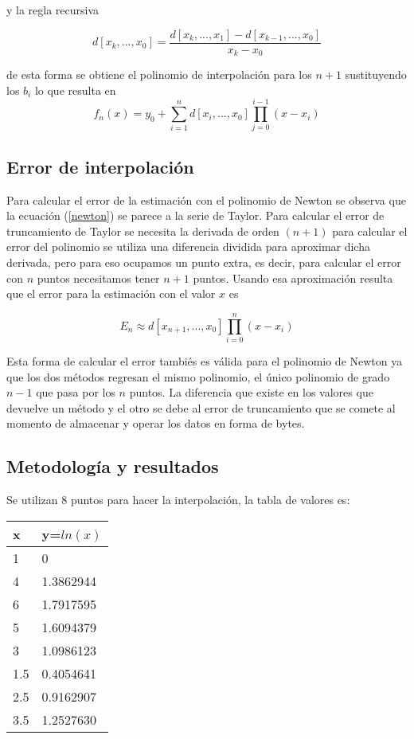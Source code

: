 \documentclass[10pt,twocolumn]{article}
\begin{document}
y la regla recursiva

\begin{equation}
	d[x_k,...,x_0]=\frac{d[x_k,...,x_1]-d[x_{k-1},...,x_0]}{x_k-x_0}
	\label{dif2}
\end{equation}

de esta forma se obtiene el polinomio de interpolaci\'on para los $n+1$ sustituyendo los $b_i$ lo que 
resulta en
\begin{equation} 	
	f_n(x)=y_0+\sum_{i=1}^{n}d[x_i,...,x_0]\prod_{j=0}^{i-1}(x-x_i)
	\label{newton}
\end{equation}

\subsection{Error de interpolaci\'on}
Para calcular el error de la estimaci\'on con el polinomio de Newton se observa que la ecuaci\'on 
(\ref{newton}) se parece a la serie de Taylor. Para calcular el error de truncamiento de Taylor se 
necesita la derivada de orden $(n+1)$ para calcular el error del polinomio se utiliza una diferencia 
dividida para aproximar dicha derivada, pero para eso ocupamos un punto extra, es decir, para calcular el 
error con $n$ puntos necesitamos tener $n+1$ puntos. Usando esa aproximaci\'on resulta que el error para 
la estimaci\'on con el valor $x$ es 

\begin{equation}
	E_n \approx d[x_{n+1},...,x_0]\prod_{i=0}^{n}(x-x_i)
	\label{mistake}
\end{equation}

Esta forma de calcular el error tambi\'es es v\'alida para el polinomio de Newton ya que los dos 
m\'etodos regresan el mismo polinomio, el \'unico polinomio de grado $n-1$ que pasa por los $n$ puntos. 
La diferencia que existe en los valores que devuelve un m\'etodo y el otro se debe al error de 
truncamiento que se comete al momento de almacenar y operar los datos en forma de bytes.

\subsection{Metodolog\'ia y resultados}
Se utilizan 8 puntos para hacer la interpolaci\'on, la tabla de valores es:

\begin{tabular}[h]{|l|l|}
	\hline
	x & y=$ln(x)$ \\ \hline
	1 & 0 \\
	4 & 1.3862944 \\
	6 & 1.7917595 \\
	5 & 1.6094379 \\
	3 & 1.0986123 \\
	1.5 & 0.4054641 \\
	2.5 & 0.9162907 \\
	3.5 & 1.2527630 \\ \hline
\end{tabular}
\end{document}
